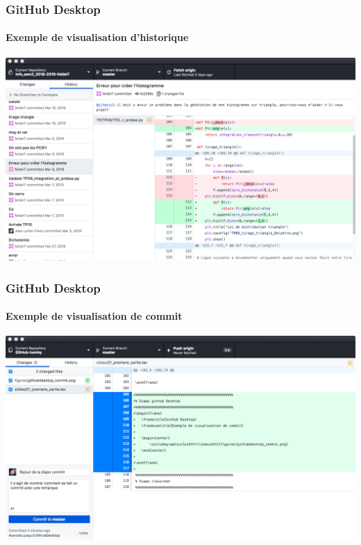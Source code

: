 \begin{frame}
	\frametitle{GitHub Desktop}
	\framesubtitle{Exemple de visualisation d'historique}

	\begin{center}
		\includegraphics[width=\linewidth]{figures/githubdesktop.png}
	\end{center}

\end{frame}

\begin{frame}
	\frametitle{GitHub Desktop}
	\framesubtitle{Exemple de visualisation de commit}

	\begin{center}
		\includegraphics[width=\linewidth]{figures/githubdesktop_commit.png}
	\end{center}

\end{frame}

